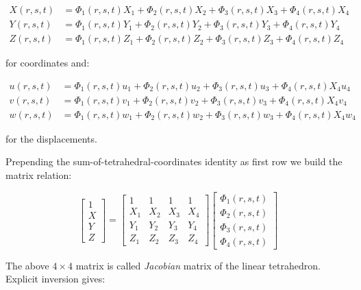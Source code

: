 \begin{align*}
X(r,s,t) &= \Phi_1(r,s,t)X_1 + \Phi_2(r,s,t)X_2 + \Phi_3(r,s,t)X_3 + \Phi_4(r,s,t)X_4\\
Y(r,s,t) &= \Phi_1(r,s,t)Y_1 + \Phi_2(r,s,t)Y_2 + \Phi_3(r,s,t)Y_3 + \Phi_4(r,s,t)Y_4 \\
Z(r,s,t) &= \Phi_1(r,s,t)Z_1 + \Phi_2(r,s,t)Z_2 + \Phi_3(r,s,t)Z_3 + \Phi_4(r,s,t)Z_4
\end{align*}

for coordinates and:

\begin{align*}
u(r,s,t) &= \Phi_1(r,s,t)u_1 + \Phi_2(r,s,t)u_2 + \Phi_3(r,s,t)u_3 + \Phi_4(r,s,t)X_4u_4 \\
v(r,s,t) &= \Phi_1(r,s,t)v_1 + \Phi_2(r,s,t)v_2 + \Phi_3(r,s,t)v_3 + \Phi_4(r,s,t)X_4v_4 \\
w(r,s,t) &= \Phi_1(r,s,t)w_1 + \Phi_2(r,s,t)w_2 + \Phi_3(r,s,t)w_3 + \Phi_4(r,s,t)X_4w_4
\end{align*}

for the displacements.

Prepending the sum-of-tetrahedral-coordinates identity as first row we build the matrix relation:

\begin{equation} \label{eq: tet4_jacobian matrix}
\begin{bmatrix}
1 \\
X \\
Y \\
Z
\end{bmatrix} = \begin{bmatrix}
1 & 1 & 1 & 1 \\
X_1 & X_2 & X_3 & X_4 \\
Y_1 & Y_2 & Y_3 & Y_4 \\
Z_1 & Z_2 & Z_3 & Z_4
\end{bmatrix} \begin{bmatrix}
\Phi_1(r,s,t)\\
\Phi_2(r,s,t)\\
\Phi_3(r,s,t)\\
\Phi_4(r,s,t)
\end{bmatrix}
\end{equation}

The above $ 4 \times 4 $ matrix is called \textit{Jacobian} matrix of the linear tetrahedron. Explicit inversion gives:

